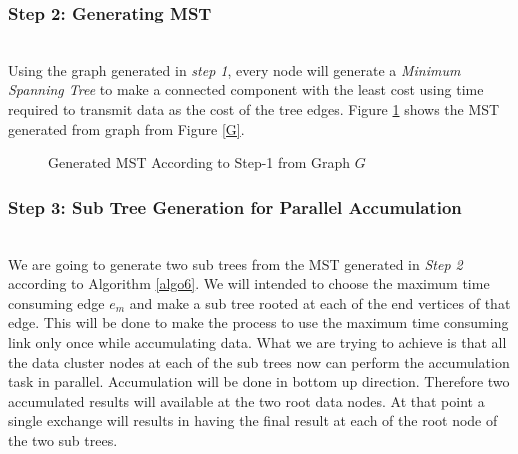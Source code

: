 \documentclass[10pt,conference,letterpaper]{IEEEtran}
\begin{document}
\subsubsection{\textbf{Step 2: Generating MST}}\hspace*{\fill} \\
Using the graph generated in \textit{step 1}, every node will generate a \textit{Minimum Spanning Tree} to make a connected component with the least cost using time required to transmit data as the cost of the tree edges. 
Figure \ref{MST} shows the MST generated from graph from Figure \ref{G}.

\begin{figure}[!htbp]
\label{MST}
\centering
{}
\caption{Generated MST According to Step-1 from Graph $G$}
\end{figure}


\subsubsection{\textbf{Step 3: Sub Tree Generation for Parallel Accumulation}}\hspace*{\fill} \\
We are going to generate two sub trees from the MST generated in \textit{Step 2} according to Algorithm \ref{algo6}. We will intended to choose the maximum time consuming edge $e_m$ and make a sub tree rooted at each of the end vertices of that edge. This will be done to make the process to use the maximum time consuming link only once while accumulating data. What we are trying to achieve is that all the data cluster nodes at each of the sub trees now can perform the accumulation task in parallel. Accumulation will be done in  bottom up direction. 
Therefore two accumulated results will  available at the two root data nodes. At that point a single exchange will results in having the final result at each of the root node of the two sub trees.
\end{document}
